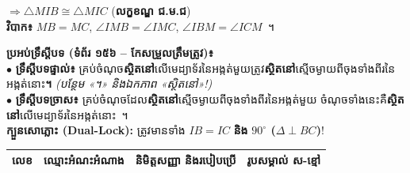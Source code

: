 \documentclass[a4paper,10pt]{article}
\newcommand{\en}[1]{{\TimesEn #1}}
\newcommand{\tri}[1]{\ensuremath{\triangle #1}}
\newcommand{\ang}[1]{\ensuremath{\angle #1}}
\newcommand{\cg}{\ensuremath{\cong}}
\begin{document}
\begin{tcolorbox}[
  enhanced, sharp corners, colback=white, colframe=black,
  boxrule=1.5pt, borderline={0.6pt}{2.2pt}{black},
  boxsep=1pt, top=4pt, bottom=4pt, left=6pt, right=6pt
]
\begin{minipage}[t]{9.05cm}
\begin{tcolorbox}[enhanced, sharp corners, colback=white, colframe=black, boxrule=0.95pt, boxsep=1pt, equal height group=posterTopPB, top=3pt, bottom=3pt, left=5pt, right=5pt]
\begin{minipage}[c]{4.45cm}
        $\Rightarrow \tri{MIB}\cg\tri{MIC}$ (\textbf{លក្ខខណ្ឌ ជ.ម.ជ})\\
        \textbf{វិបាក៖} $MB=MC$, $\ang{IMB}=\ang{IMC}$, $\ang{IBM}=\ang{ICM}$~។
      \end{minipage}
    \end{tcolorbox}
  \end{minipage}\hfill
  \begin{minipage}[t]{8.75cm}
    \begin{tcolorbox}[enhanced, sharp corners, colback=panelgray, colframe=black, boxrule=0.95pt, boxsep=1pt, equal height group=posterTopPB, top=3pt, bottom=3pt, left=5pt, right=5pt]
      \raggedright\fontsize{7.4pt}{10.6pt}\selectfont
      \textbf{ប្រអប់ទ្រឹស្ដីបទ (ទំព័រ ១៥៦ \en{--} កែសម្រួលត្រឹមត្រូវ)៖}\\
      $\bullet$ \textbf{ទ្រឹស្ដីបទផ្ទាល់៖} គ្រប់ចំណុច\textbf{ស្ថិតនៅ}លើមេដ្យាទ័រនៃអង្កត់មួយត្រូវ\textbf{ស្ថិតនៅ}ស្មើចម្ងាយពីចុងទាំងពីរនៃអង្កត់នោះ\textbf{។} \textit{(បន្ថែម «។» និងឯកភាព «ស្ថិតនៅ»!)}\\
      $\bullet$ \textbf{ទ្រឹស្ដីបទច្រាស៖} គ្រប់ចំណុចដែល\textbf{ស្ថិតនៅ}ស្មើចម្ងាយពីចុងទាំងពីរនៃអង្កត់មួយ ចំណុចទាំងនេះគឺ\textbf{ស្ថិតនៅ}លើមេដ្យាទ័រនៃអង្កត់នោះ~។\\[2pt]
      \textbf{ក្បួនសោភ្លោះ (\en{Dual-Lock}):} ត្រូវមានទាំង \textbf{$IB=IC$} \textbf{និង} \textbf{$90^\circ$ ($\Delta\perp BC$)}!
    \end{tcolorbox}
  \end{minipage}

  \vspace{3.5pt}

  \fontsize{7.6pt}{10.6pt}\selectfont
  \renewcommand{\arraystretch}{1.05}
  \begin{tabular}{|C{0.70cm}|L{4.25cm}|L{6.30cm}|C{4.95cm}|}
    \hline
    \textbf{លេខ} &
    \centering\arraybackslash\textbf{ឈ្មោះអំណះអំណាង} &
    \centering\arraybackslash\textbf{និមិត្តសញ្ញា និងរបៀបប្រើ} &
    \centering\arraybackslash\textbf{រូបសម្គាល់ ស-ខ្មៅ} \\ \hline


\end{tabular}
\end{tcolorbox}
\end{document}
